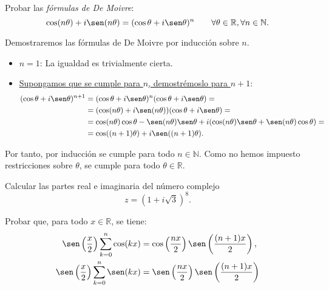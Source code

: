 \begin{ejercicio}
    Probar las \emph{fórmulas de De Moivre}:
    \[
        \cos(n\theta) + i\sen(n\theta) = (\cos\theta + i\sen\theta)^n \qquad \forall \theta \in \mathbb{R}, \forall n \in \mathbb{N}.
    \]

    Demostraremos las fórmulas de De Moivre por inducción sobre $n$.
    \begin{itemize}
        \item \ul{$n=1$}: La igualdad es trivialmente cierta.
        \item \ul{Supongamos que se cumple para $n$, demostrémoslo para $n+1$}:
        \begin{align*}
            (\cos\theta + i\sen\theta)^{n+1}
            &= (\cos\theta + i\sen\theta)^n(\cos\theta + i\sen\theta)
            =\\&= (\cos(n\theta) + i\sen(n\theta))(\cos\theta + i\sen\theta)
            =\\&= \cos(n\theta)\cos\theta - \sen(n\theta)\sen\theta + i(\cos(n\theta)\sen\theta + \sen(n\theta)\cos\theta) = \\&=
            \cos((n+1)\theta) + i\sen((n+1)\theta).
        \end{align*}
    \end{itemize}

    Por tanto, por inducción se cumple para todo $n\in \mathbb{N}$. Como no hemos impuesto restricciones sobre $\theta$, se cumple para todo $\theta \in \mathbb{R}$.
\end{ejercicio}

\begin{ejercicio}
    Calcular las partes real e imaginaria del número complejo
    \[
        z=\left(1+i\sqrt{3}\right)^8.
    \]
\end{ejercicio}

\begin{ejercicio}
    Probar que, para todo $x \in \mathbb{R}$, se tiene:
    \begin{align}
        \sen\left(\frac{x}{2}\right)\sum_{k=0}^n \cos(kx) &= \cos \left(\dfrac{nx}{2}\right) \sen\left(\dfrac{(n+1)x}{2}\right), \\
        \sen\left(\frac{x}{2}\right)\sum_{k=0}^n \sen(kx) &= \sen \left(\dfrac{nx}{2}\right) \sen\left(\dfrac{(n+1)x}{2}\right)
    \end{align}
\end{ejercicio}